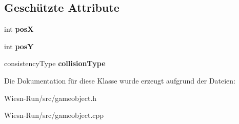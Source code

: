 \subsection*{Geschützte Attribute}
\begin{DoxyCompactItemize}
\item 
\hypertarget{classGameObject_a02b13dc4d29636ea6e7c66ac90e5198f}{int {\bfseries pos\-X}}\label{classGameObject_a02b13dc4d29636ea6e7c66ac90e5198f}

\item 
\hypertarget{classGameObject_a8bce50c4f2732c4ceff89aac8525efa2}{int {\bfseries pos\-Y}}\label{classGameObject_a8bce50c4f2732c4ceff89aac8525efa2}

\item 
\hypertarget{classGameObject_a1e34c9fc69dc662a5193907727222666}{consistency\-Type {\bfseries collision\-Type}}\label{classGameObject_a1e34c9fc69dc662a5193907727222666}

\end{DoxyCompactItemize}


Die Dokumentation für diese Klasse wurde erzeugt aufgrund der Dateien\-:\begin{DoxyCompactItemize}
\item 
Wiesn-\/\-Run/src/gameobject.\-h\item 
Wiesn-\/\-Run/src/gameobject.\-cpp\end{DoxyCompactItemize}
